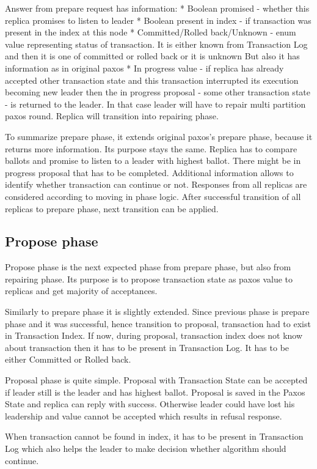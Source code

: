 Answer from prepare request has information:
* Boolean promised - whether this replica promises to listen to leader
* Boolean present in index - if transaction was present in the index at this node
* Committed/Rolled back/Unknown - enum value representing status of transaction. It is either known from Transaction Log and then it is one of committed or rolled back or it is unknown
But also it has information as in original paxos
* In progress value - if replica has already accepted other transaction state and this transaction interrupted its execution becoming new leader then the in progress proposal - some other transaction state - is returned to the leader. In that case leader will have to repair multi partition paxos round. Replica will transition into repairing phase.


To summarize prepare phase, it extends original paxos’s prepare phase, because it returns more information. Its purpose stays the same. Replica has to compare ballots and promise to listen to a leader with highest ballot. There might be in progress proposal that has to be completed. Additional information allows to identify whether transaction can continue or not. Responses from all replicas are considered according to moving in phase logic.
After successful transition of all replicas to prepare phase, next transition can be applied.


\subsection{Propose phase}
Propose phase is the next expected phase from prepare phase, but also from repairing phase. Its purpose is to propose transaction state as paxos value to replicas and get majority of acceptances. 


Similarly to prepare phase it is slightly extended. Since previous phase is prepare phase and it was successful, hence transition to proposal, transaction had to exist in Transaction Index. If now, during proposal,  transaction index does not know about transaction then it has to be present in Transaction Log. It has to be either Committed or Rolled back. 


Proposal phase is quite simple. Proposal with Transaction State can be accepted if leader still is the leader and has highest ballot. Proposal is saved in the Paxos State and replica can reply with success. Otherwise leader could have lost his leadership and value cannot be accepted which results in refusal response.


When transaction cannot be found in index, it has to be present in Transaction Log which also helps the leader to make decision whether algorithm should continue.


